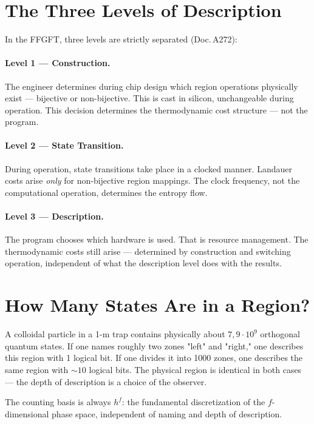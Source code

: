 \section{The Three Levels of Description}

In the FFGFT, three levels are strictly separated (Doc.\,A272): 

\paragraph{Level 1 --- Construction.}
The engineer determines during chip design which region operations
physically exist --- bijective or non-bijective. This is cast in silicon,
unchangeable during operation. This decision determines
the thermodynamic cost structure --- not the program.

\paragraph{Level 2 --- State Transition.}
During operation, state transitions take place in a clocked manner.
Landauer costs arise \emph{only} for non-bijective region mappings.
The clock frequency, not the computational operation, determines the entropy flow.

\paragraph{Level 3 --- Description.}
The program chooses which hardware is used. That is
resource management. The thermodynamic costs still arise ---
determined by construction and switching operation, independent of
what the description level does with the results.

\section{How Many States Are in a Region?}

A colloidal particle in a 1-\textmu m trap contains physically about
$7{,}9 \cdot 10^9$ orthogonal quantum states. If one names roughly two zones
"left" and "right," one describes this region with 1 logical bit.
If one divides it into 1000 zones, one describes the same region with ${\sim}10$
logical bits. The physical region is identical in both cases ---
the depth of description is a choice of the observer. 

The counting basis is always $h^f$: the fundamental discretization of the
$f$-dimensional phase space, independent of naming and depth of description.

